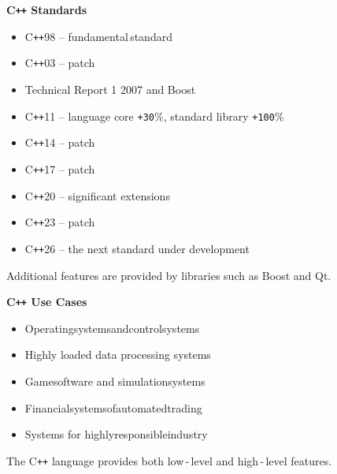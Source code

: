 \documentclass{beamer}
\begin{document}
\begin{frame}{\bf C\texttt{++} Standards}

    \begin{itemize}

        \item C\texttt{++}98 -- fundamental\,standard

        \item C\texttt{++}03 -- patch

        \item Technical Report 1 2007 and Boost

        \item C\texttt{++}11 -- language core \texttt{+30}\%, standard library \texttt{+100}\%

        \item C\texttt{++}14 -- patch

        \item C\texttt{++}17 -- patch

        \item C\texttt{++}20 -- significant extensions

        \item C\texttt{++}23 -- patch

        \item C\texttt{++}26 -- the next standard under development
         
    \end{itemize}

    \begin{block}
    \justifying Additional features are provided by libraries such as Boost and Qt.
    \end{block}
    
\end{frame}

\begin{frame}{\bf C\texttt{++} Use Cases}
    
    \begin{itemize}

        \item Operating\:systems\;and\;control\:systems

        \item Highly loaded data processing systems

        \item Game\;software and simulation\;systems

        \item Financial\:systems\:of\:automated\:trading

        \item Systems for highly\;responsible\;industry
        
    \end{itemize}

    \begin{block}
    \justifying The C\texttt{++} language provides both low\,-\,level and high\,-\,level features.
    \end{block}
    
\end{frame}
\end{document}

